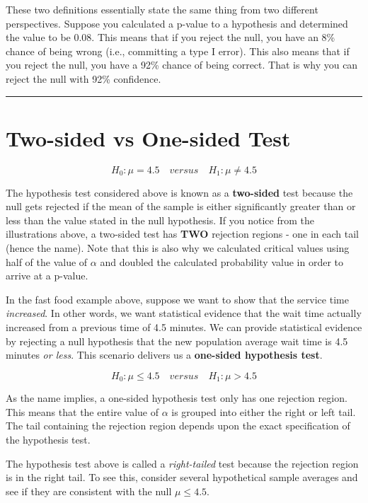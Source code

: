 \documentclass[
]{book}
\begin{document}
These two definitions essentially state the same thing from two different perspectives. Suppose you calculated a p-value to a hypothesis and determined the value to be 0.08. This means that if you reject the null, you have an 8\% chance of being wrong (i.e., committing a type I error). This also means that if you reject the null, you have a 92\% chance of being correct. That is why you can reject the null with 92\% confidence.

\begin{center}\rule{0.5\linewidth}{0.5pt}\end{center}

\hypertarget{two-sided-vs-one-sided-test}{%
\section{Two-sided vs One-sided Test}\label{two-sided-vs-one-sided-test}}

\[H_0:\mu=4.5 \quad versus \quad H_1:\mu\neq 4.5\]

The hypothesis test considered above is known as a \textbf{two-sided} test because the null gets rejected if the mean of the sample is either significantly greater than or less than the value stated in the null hypothesis. If you notice from the illustrations above, a two-sided test has \textbf{TWO} rejection regions - one in each tail (hence the name). Note that this is also why we calculated critical values using half of the value of \(\alpha\) and doubled the calculated probability value in order to arrive at a p-value.

In the fast food example above, suppose we want to show that the service time \emph{increased}. In other words, we want statistical evidence that the wait time actually increased from a previous time of 4.5 minutes. We can provide statistical evidence by rejecting a null hypothesis that the new population average wait time is 4.5 minutes \emph{or less}. This scenario delivers us a \textbf{one-sided hypothesis test}.

\[H_0:\mu \leq 4.5 \quad versus \quad H_1:\mu> 4.5\]

As the name implies, a one-sided hypothesis test only has one rejection region. This means that the entire value of \(\alpha\) is grouped into either the right or left tail. The tail containing the rejection region depends upon the exact specification of the hypothesis test.

The hypothesis test above is called a \emph{right-tailed} test because the rejection region is in the right tail. To see this, consider several hypothetical sample averages and see if they are consistent with the null \(\mu \leq 4.5\).
\end{document}
